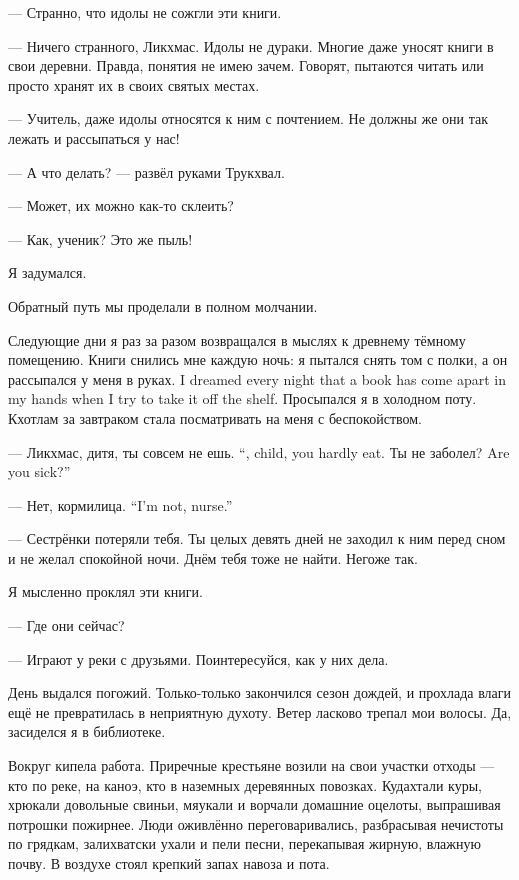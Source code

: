 --- Странно, что идолы не сожгли эти книги.

--- Ничего странного, Ликхмас.
Идолы не дураки.
Многие даже уносят книги в свои деревни.
Правда, понятия не имею зачем.
Говорят, пытаются читать или просто хранят их в своих святых местах.

--- Учитель, даже идолы относятся к ним с почтением.
Не должны же они так лежать и рассыпаться у нас!

--- А что делать? --- развёл руками Трукхвал.

--- Может, их можно как-то склеить?

--- Как, ученик?
Это же пыль!

Я задумался.

Обратный путь мы проделали в полном молчании.

Следующие дни я раз за разом возвращался в мыслях к древнему тёмному помещению.
{Книги снились мне каждую ночь: я пытался снять том с полки, а он рассыпался у меня в руках.}
{I dreamed every night that a book has come apart in my hands when I try to take it off the shelf.}
Просыпался я в холодном поту.
Кхотлам за завтраком стала посматривать на меня с беспокойством.

{--- Ликхмас, дитя, ты совсем не ешь.}
{``\Likchmas, child, you hardly eat.}
{Ты не заболел?}
{Are you sick?''}

{--- Нет, кормилица.}
{``I'm not, nurse.''}

--- Сестрёнки потеряли тебя.
Ты целых девять дней не заходил к ним перед сном и не желал спокойной ночи.
Днём тебя тоже не найти.
Негоже так.

Я мысленно проклял эти книги.

--- Где они сейчас?

--- Играют у реки с друзьями.
Поинтересуйся, как у них дела.

День выдался погожий.
Только-только закончился сезон дождей, и прохлада влаги ещё не превратилась в неприятную духоту.
Ветер ласково трепал мои волосы.
Да, засиделся я в библиотеке.

Вокруг кипела работа.
Приречные крестьяне возили на свои участки отходы --- кто по реке, на каноэ, кто в наземных деревянных повозках.
Кудахтали куры, хрюкали довольные свиньи, мяукали и ворчали домашние оцелоты, выпрашивая потрошки пожирнее.
Люди оживлённо переговаривались, разбрасывая нечистоты по грядкам, залихватски ухали и пели песни, перекапывая жирную, влажную почву.
В воздухе стоял крепкий запах навоза и пота.

